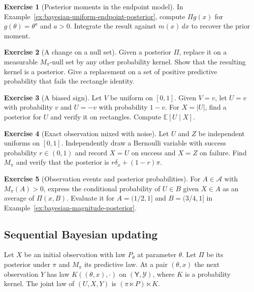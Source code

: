 \documentclass[11pt,oneside]{book}
\theoremstyle{definition}
\newtheorem{exercise}{Exercise}[section]
\theoremstyle{remark}
\begin{document}
\begin{exercise}[Posterior moments in the endpoint model]
\label{exer:bayesian-endpoint-posterior-moments}
In Example~\ref{ex:bayesian-uniform-endpoint-posterior}, compute
$\Pi g(x)$ for $g(\theta)=\theta^a$ and $a>0$. Integrate the result
against $m(x)\,dx$ to recover the prior moment.
\end{exercise}

\begin{exercise}[A change on a null set]
\label{exer:bayesian-posterior-null-replacement}
Given a posterior $\Pi$, replace it on a measurable $M_\pi$-null
set by any other probability kernel. Show that the resulting kernel
is a posterior. Give a replacement on a set of positive predictive
probability that fails the rectangle identity.
\end{exercise}

\begin{exercise}[A biased sign]
\label{exer:bayesian-biased-sign-posterior}
Let $V$ be uniform on $[0,1]$. Given $V=v$, let $U=v$ with
probability $v$ and $U=-v$ with probability $1-v$. For $X=|U|$,
find a posterior for $U$ and verify it on rectangles. Compute
$\mathbb E[U\mid X]$.
\end{exercise}

\begin{exercise}[Exact observation mixed with noise]
\label{exer:bayesian-exact-or-noise}
Let $U$ and $Z$ be independent uniforms on $[0,1]$. Independently
draw a Bernoulli variable with success probability $r\in(0,1)$ and
record $X=U$ on success and $X=Z$ on failure. Find $M_\pi$ and
verify that the posterior is $r\delta_x+(1-r)\pi$.
\end{exercise}

\begin{exercise}[Observation events and posterior probabilities]
\label{exer:bayesian-average-event-posterior}
For $A\in\mathcal A$ with $M_\pi(A)>0$, express the conditional
probability of $U\in B$ given $X\in A$ as an average of
$\Pi(x,B)$. Evaluate it for $A=(1/2,1]$ and $B=(3/4,1]$ in
Example~\ref{ex:bayesian-magnitude-posterior}.
\end{exercise}

\subsection{Sequential Bayesian updating}
\label{subsec:bayesian-sequential-updating}

Let $X$ be an initial observation with law $P_\theta$ at parameter
$\theta$. Let $\Pi$ be its posterior under $\pi$ and $M_\pi$ its
predictive law. At a pair $(\theta,x)$ the next observation $Y$ has
law $K((\theta,x),\cdot)$ on $(\mathsf Y,\mathcal Y)$, where $K$ is
a probability kernel. The joint law of $(U,X,Y)$ is
$(\pi\ltimes P)\ltimes K$.
\end{document}
